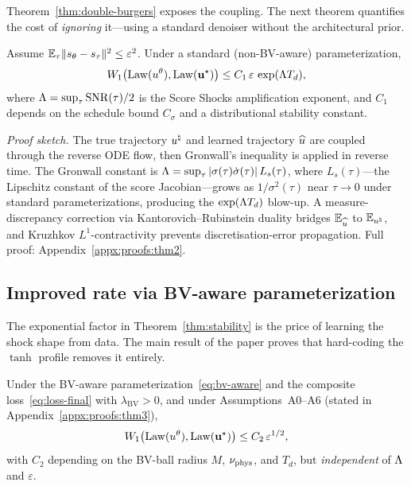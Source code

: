 Theorem~\ref{thm:double-burgers} exposes the coupling. The next theorem quantifies the cost of \emph{ignoring} it---using a standard denoiser without the architectural prior.

\begin{theorem}
\label{thm:stability}
Assume $\mathbb{E}_{\tau}\lVert s_{\theta} - s_{\tau} \rVert^{2}\le\varepsilon^{2}$. Under a standard (non-BV-aware) parameterization,
\begin{equation}
  \label{eq:thm-stability}
  W_{1}\bigl(\mathrm{Law}(u^{\theta}), \mathrm{Law}(\mathbf{u}^{\star})\bigr) \le C_{1}\,\varepsilon\,\exp(\Lambda T_{d}),
\end{equation}
where $\Lambda=\sup_{\tau}\mathrm{SNR}(\tau)/2$ is the Score Shocks amplification exponent, and $C_{1}$ depends on the schedule bound $C_{\sigma}$ and a distributional stability constant.
\end{theorem}

\textit{Proof sketch.} The true trajectory $u^{\natural}$ and learned trajectory $\widehat{u}$ are coupled through the reverse {ODE} flow, then Gronwall's inequality is applied in reverse time. The Gronwall constant is $\Lambda = \sup_{\tau}|\sigma(\tau)\dot\sigma(\tau)|\,L_{s}(\tau)$, where $L_{s}(\tau)$---the Lipschitz constant of the score Jacobian---grows as $1/\sigma^{2}(\tau)$ near $\tau\to0$ under standard parameterizations, producing the $\exp(\Lambda T_{d})$ blow-up. A measure-discrepancy correction via Kantorovich--Rubinstein duality bridges $\mathbb{E}_{\widehat{u}}$ to $\mathbb{E}_{u^{\natural}}$, and Kruzhkov $L^{1}$-contractivity prevents discretisation-error propagation. Full proof: Appendix~\ref{appx:proofs:thm2}.

\subsection{Improved rate via BV-aware parameterization}
\label{sec:theory:improved-rate}

The exponential factor in Theorem~\ref{thm:stability} is the price of learning the shock shape from data. The main result of the paper proves that hard-coding the $\tanh$ profile removes it entirely.

\begin{theorem}
\label{thm:improved-rate}
Under the BV-aware parameterization~\eqref{eq:bv-aware} and the composite loss~\eqref{eq:loss-final} with $\lambda_{\mathrm{BV}}>0$, and under Assumptions~A0--A6 (stated in Appendix~\ref{appx:proofs:thm3}),
\begin{equation}
  \label{eq:thm-improved}
  W_{1}\bigl(\mathrm{Law}(u^{\theta}), \mathrm{Law}(\mathbf{u}^{\star})\bigr) \le C_{2}\,\varepsilon^{1/2},
\end{equation}
with $C_{2}$ depending on the {BV}-ball radius $M$, $\nu_{\mathrm{phys}}$, and $T_{d}$, but \emph{independent} of $\Lambda$ and $\varepsilon$.
\end{theorem}

